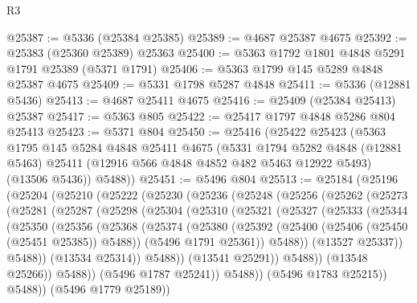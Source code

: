 \begin{lexlean}{R3}
\begin{coremodule}
@25387 := @5336 (@25384 @25385)
@25389 := @4687 @25387 @4675
@25392 := @25383 (@25360 @25389) @25363
@25400 := @5363 @1792 @1801 @4848 @5291 @1791 @25389 (@5371 @1791)
@25406 := @5363 @1799 @145 @5289 @4848 @25387 @4675
@25409 := @5331 @1798 @5287 @4848
@25411 := @5336 (@12881 @5436)
@25413 := @4687 @25411 @4675
@25416 := @25409 (@25384 @25413) @25387
@25417 := @5363 @805
@25422 := @25417 @1797 @4848 @5286 @804 @25413
@25423 := @5371 @804
@25450 := @25416
    (@25422
      @25423
      (@5363
        @1795
        @145
        @5284
        @4848
        @25411
        @4675
        (@5331
          @1794
          @5282
          @4848
          (@12881 @5463)
          @25411
          (@12916 @566 @4848 @4852 @482 @5463 @12922 @5493)
          (@13506 @5436))
        @5488))
@25451 := @5496 @804
@25513 := @25184
    (@25196
      (@25204
        (@25210
          (@25222
            (@25230
              (@25236
                (@25248
                  (@25256
                    (@25262
                      (@25273
                        (@25281
                          (@25287
                            (@25298
                              (@25304
                                (@25310
                                  (@25321
                                    (@25327
                                      (@25333
                                        (@25344
                                          (@25350
                                            (@25356
                                              (@25368
                                                (@25374
                                                  (@25380
                                                    (@25392
                                                      (@25400
                                                        (@25406 (@25450 (@25451 @25385)) @5488))
                                                      (@5496 @1791 @25361))
                                                    @5488))
                                                (@13527 @25337))
                                              @5488))
                                          (@13534 @25314))
                                        @5488))
                                    (@13541 @25291))
                                  @5488))
                              (@13548 @25266))
                            @5488))
                        (@5496 @1787 @25241))
                      @5488))
                  (@5496 @1783 @25215))
                @5488))
            (@5496 @1779 @25189))

\end{coremodule}
\end{lexlean}
